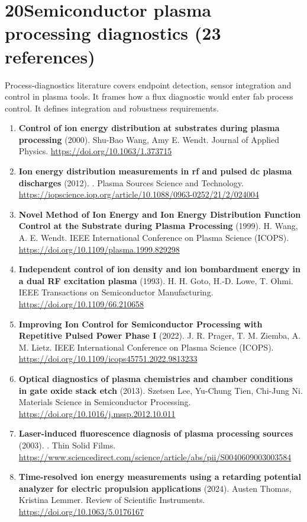 \documentclass[11pt,a4paper]{article}
\begin{document}
\section*{20\quad Semiconductor plasma processing diagnostics \textnormal{(\normalsize 23 references)}}
Process-diagnostics literature covers endpoint detection, sensor integration and control in plasma tools. It frames how a flux diagnostic would enter fab process control. It defines integration and robustness requirements.
\begin{enumerate}[leftmargin=1.4em]
\item \textbf{Control of ion energy distribution at substrates during plasma processing} (2000). Shu-Bao Wang, Amy E. Wendt. Journal of Applied Physics. \url{https://doi.org/10.1063/1.373715}
\item \textbf{Ion energy distribution measurements in rf and pulsed dc plasma discharges} (2012). . Plasma Sources Science and Technology. \url{https://iopscience.iop.org/article/10.1088/0963-0252/21/2/024004}
\item \textbf{Novel Method of Ion Energy and Ion Energy Distribution Function Control at the Substrate during Plasma Processing} (1999). H. Wang, A. E. Wendt. IEEE International Conference on Plasma Science (ICOPS). \url{https://doi.org/10.1109/plasma.1999.829298}
\item \textbf{Independent control of ion density and ion bombardment energy in a dual RF excitation plasma} (1993). H. H. Goto, H.-D. Lowe, T. Ohmi. IEEE Transactions on Semiconductor Manufacturing. \url{https://doi.org/10.1109/66.210658}
\item \textbf{Improving Ion Control for Semiconductor Processing with Repetitive Pulsed Power Phase I} (2022). J. R. Prager, T. M. Ziemba, A. M. Lietz. IEEE International Conference on Plasma Science (ICOPS). \url{https://doi.org/10.1109/icops45751.2022.9813233}
\item \textbf{Optical diagnostics of plasma chemistries and chamber conditions in gate oxide stack etch} (2013). Szetsen Lee, Yu-Chung Tien, Chi-Jung Ni. Materials Science in Semiconductor Processing. \url{https://doi.org/10.1016/j.mssp.2012.10.011}
\item \textbf{Laser-induced fluorescence diagnosis of plasma processing sources} (2003). . Thin Solid Films. \url{https://www.sciencedirect.com/science/article/abs/pii/S0040609003003584}
\item \textbf{Time-resolved ion energy measurements using a retarding potential analyzer for electric propulsion applications} (2024). Austen Thomas, Kristina Lemmer. Review of Scientific Instruments. \url{https://doi.org/10.1063/5.0176167}

\end{enumerate}
\end{document}
